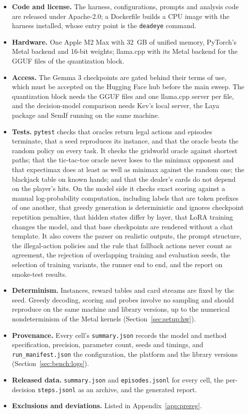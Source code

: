 \begin{itemize}
  \item \textbf{Code and license.} The harness, configurations, prompts and analysis code are released under Apache-2.0; a Dockerfile builds a CPU image with the harness installed, whose entry point is the \texttt{deadeye} command.
  \item \textbf{Hardware.} One Apple M2 Max with 32~GB of unified memory, PyTorch's Metal backend and 16-bit weights; llama.cpp with its Metal backend for the GGUF files of the quantization block. 
  \item \textbf{Access.} The Gemma 3 checkpoints are gated behind their terms of use, which must be accepted on the Hugging Face hub before the main sweep. The quantization block needs the GGUF files and one llama.cpp server per file, and the decision-model comparison needs Kev's local server, the Laya package and SemIf running on the same machine.
  \item \textbf{Tests.} \texttt{pytest} checks that oracles return legal actions and episodes terminate, that a seed reproduces its instance, and that the oracle beats the random policy on every task. It checks the gridworld oracle against shortest paths; that the tic-tac-toe oracle never loses to the minimax opponent and that expectimax does at least as well as minimax against the random one; the blackjack table on known hands; and that the dealer's cards do not depend on the player's hits. On the model side it checks exact scoring against a manual log-probability computation, including labels that are token prefixes of one another, that greedy generation is deterministic and ignores checkpoint repetition penalties, that hidden states differ by layer, that LoRA training changes the model, and that base checkpoints are rendered without a chat template. It also covers the parser on realistic outputs, the prompt structure, the illegal-action policies and the rule that fallback actions never count as agreement, the rejection of overlapping training and evaluation seeds, the selection of training variants, the runner end to end, and the report on smoke-test results.
  \item \textbf{Determinism.} Instances, reward tables and card streams are fixed by the seed. Greedy decoding, scoring and probes involve no sampling and should reproduce on the same machine and library versions, up to the numerical nondeterminism of the Metal kernels (Section~\ref{sec:setup:hw}).
  \item \textbf{Provenance.} Every cell's \texttt{summary.json} records the model and method specification, precision, parameter count, seeds and timings, and \texttt{run\_manifest.json} the configuration, the platform and the library versions (Section~\ref{sec:bench:logs}).
  \item \textbf{Released data.} \texttt{summary.json} and \texttt{episodes.jsonl} for every cell, the per-decision \texttt{steps.jsonl} as an archive, and the generated report. 
  \item \textbf{Exclusions and deviations.} Listed in Appendix~\ref{app:prereg}.
\end{itemize}

